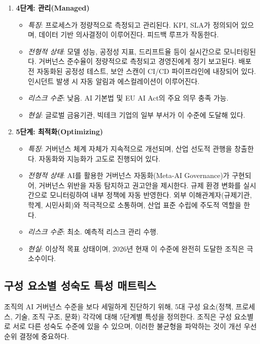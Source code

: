 \begin{enumerate}
\begin{itemize}
 \item \textit{리스크 수준}: 중간. AI 기본법의 기본 의무 충족 가능.
 \item \textit{현실}: AI 거버넌스에 선제적으로 투자한 금융, 의료 분야 대기업의 현재 수준에 해당한다.
 \end{itemize}
 \item \textbf{4단계: 관리(Managed)}
 \begin{itemize}
 \item \textit{특징}: 프로세스가 정량적으로 측정되고 관리된다. KPI, SLA가 정의되어 있으며, 데이터 기반 의사결정이 이루어진다. 피드백 루프가 작동한다.
 \item \textit{전형적 상태}: 모델 성능, 공정성 지표, 드리프트율 등이 실시간으로 모니터링된다. 거버넌스 준수율이 정량적으로 측정되고 경영진에게 정기 보고된다. 배포 전 자동화된 공정성 테스트, 보안 스캔이 CI/CD 파이프라인에 내장되어 있다. 인시던트 발생 시 자동 알림과 에스컬레이션이 이루어진다.
 \item \textit{리스크 수준}: 낮음. AI 기본법 및 EU AI Act의 주요 의무 충족 가능.
 \item \textit{현실}: 글로벌 금융기관, 빅테크 기업의 일부 부서가 이 수준에 도달해 있다.
 \end{itemize}
 \item \textbf{5단계: 최적화(Optimizing)}
 \begin{itemize}
 \item \textit{특징}: 거버넌스 체계 자체가 지속적으로 개선되며, 산업 선도적 관행을 창출한다. 자동화와 지능화가 고도로 진행되어 있다.
 \item \textit{전형적 상태}: AI를 활용한 거버넌스 자동화(Meta-AI Governance)가 구현되어, 거버넌스 위반을 자동 탐지하고 권고안을 제시한다. 규제 환경 변화를 실시간으로 모니터링하여 내부 정책에 자동 반영한다. 외부 이해관계자(규제기관, 학계, 시민사회)와 적극적으로 소통하며, 산업 표준 수립에 주도적 역할을 한다.
 \item \textit{리스크 수준}: 최소. 예측적 리스크 관리 수행.
 \item \textit{현실}: 이상적 목표 상태이며, 2026년 현재 이 수준에 완전히 도달한 조직은 극소수이다.
 \end{itemize}
\end{enumerate}

\subsection{구성 요소별 성숙도 특성 매트릭스}
\label{sec:maturity_matrix}

조직의 AI 거버넌스 수준을 보다 세밀하게 진단하기 위해, 5대 구성 요소(정책, 프로세스, 기술, 조직 구조, 문화) 각각에 대해 5단계별 특성을 정의한다. 조직은 구성 요소별로 서로 다른 성숙도 수준에 있을 수 있으며, 이러한 불균형을 파악하는 것이 개선 우선순위 결정에 중요하다.

